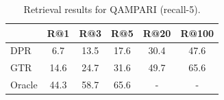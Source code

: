 \begin{table}[t]
    \centering
    \small
    \begin{tabular}{@{}lccccc@{}}
    \toprule
     & R@1 & R@3 & R@5 & R@20 & R@100 \\ \midrule
    DPR & 6.7 & 13.5 & 17.6 & 30.4 & 47.6 \\
    GTR & 14.6 & 24.7 & 31.6 & 49.7 & {65.6} \\
    Oracle & 44.3 & 58.7 & 65.6 & - & - \\
    \bottomrule
    \end{tabular}
    \caption{Retrieval results for QAMPARI (recall-5).}
    \label{tab:retrieval-qampari}
\end{table}